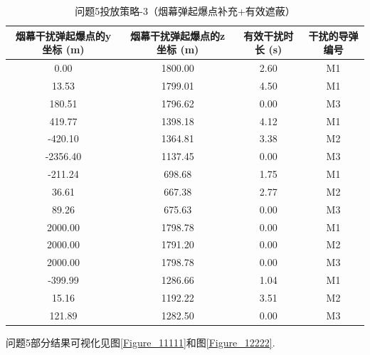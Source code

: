 \documentclass[../main.tex]{subfiles}
\begin{document}
\begin{table}[H]
\caption{问题5投放策略-3（烟幕弹起爆点补充+有效遮蔽）}
\label{tab:....032} 
\centering
\begin{scriptsize}
\begin{tabular}{cccc}
\toprule[1.5pt]
烟幕干扰弹起爆点的y坐标 (m) & 烟幕干扰弹起爆点的z坐标 (m) & 有效干扰时长 (s) & 干扰的导弹编号 \\
\midrule[1pt]
0.00  & 1800.00 & 2.60 & M1 \\  %
13.53 & 1799.01 & 4.50 & M1 \\  %
180.51& 1796.62 & 0.00 & M3  \\  %
419.77& 1398.18 & 4.12 & M1 \\  %
-420.10&1364.81 & 3.38 & M2 \\  %
-2356.40&1137.45& 0.00 & M3  \\  %
-211.24& 698.68 & 1.75 & M1 \\  %
36.61  & 667.38 & 2.77 & M2 \\  %
89.26  & 675.63 & 0.00 & M3 \\  %
2000.00& 1798.78 & 0.00 & M1  \\  %
2000.00& 1791.20 & 0.00 & M2 \\  %
2000.00& 1798.78 & 0.00 & M3 \\  %
-399.99& 1286.66 & 1.04 & M1 \\  %
15.16  & 1192.22 & 3.51 & M2 \\  %
121.89 & 1282.50 & 0.00 & M3 \\  %
\bottomrule[1.5pt]
\end{tabular}
\end{scriptsize}
\end{table}

问题5部分结果可视化见图\ref{Figure_11111}和图\ref{Figure_12222}.
\end{document}
